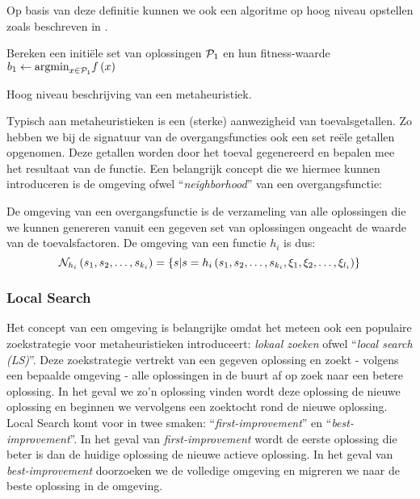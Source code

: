 Op basis van deze definitie kunnen we ook een algoritme op hoog niveau opstellen zoals beschreven in .

\begin{algorithm}[H]
 \SetAlgoLined
 Bereken een initi\"ele set van oplossingen $\mathcal{P}_1$ en hun fitness-waarde\;
 $b_1\leftarrow\displaystyle\mbox{argmin}_{x\in\mathcal{P}_1}{f\left(x\right)}$\;
 \caption{Hoog niveau beschrijving van een metaheuristiek\cite{DBLP:journals/jc/ShonkwilerV94}.}
\end{algorithm}

Typisch aan metaheuristieken is een (sterke) aanwezigheid van toevalsgetallen. Zo hebben we bij de signatuur van de overgangsfuncties ook een set re\"ele getallen opgenomen. Deze getallen worden door het toeval gegenereerd en bepalen mee het resultaat van de functie. Een belangrijk concept die we hiermee kunnen introduceren is de omgeving ofwel ``\emph{neighborhood}'' van een overgangsfunctie:

\begin{definition}
De omgeving van een overgangsfunctie is de verzameling van alle oplossingen die we kunnen genereren vanuit een gegeven set van oplossingen ongeacht de waarde van de toevalsfactoren. De omgeving van een functie $h_i$ is dus:
\begin{equation}
\mathcal{N}_{h_i}\left(s_1,s_2,\ldots,s_{k_i}\right)=\left\{ s|s=h_i\left(s_1,s_2,\ldots,s_{k_i},\xi_1,\xi_2,\ldots,\xi_{l_i}\right)\right\}
\end{equation}
\end{definition}

\subsubsection{Local Search}
Het concept van een omgeving is belangrijke omdat het meteen ook een populaire zoekstrategie voor metaheuristieken introduceert: \emph{lokaal zoeken} ofwel ``\emph{local search (LS)}''. Deze zoekstrategie vertrekt van een gegeven oplossing en zoekt - volgens een bepaalde omgeving - alle oplossingen in de buurt af op zoek naar een betere oplossing. In het geval we zo'n oplossing vinden wordt deze oplossing de nieuwe oplossing en beginnen we vervolgens een zoektocht rond de nieuwe oplossing. Local Search komt voor in twee smaken: ``\emph{first-improvement}'' en ``\emph{best-improvement}''. In het geval van \emph{first-improvement} wordt de eerste oplossing die beter is dan de huidige oplossing de nieuwe actieve oplossing. In het geval van \emph{best-improvement} doorzoeken we de volledige omgeving en migreren we naar de beste oplossing in de omgeving.
